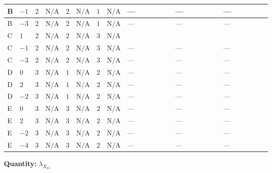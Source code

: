 \documentclass[8pt]{article}
\begin{document}
\begin{landscape}
\begin{longtable}{@{}llcccccc >{\raggedright\arraybackslash}p{0.21\linewidth} >{\raggedright\arraybackslash}p{0.21\linewidth} >{\raggedright\arraybackslash}p{0.21\linewidth}@{}}
\midrule
B & $-1$ & $2$ & $\text{N/A}$ & $2$ & $\text{N/A}$ & $1$ & $\text{N/A}$ & --- & --- & --- \\
\midrule
B & $-3$ & $2$ & $\text{N/A}$ & $2$ & $\text{N/A}$ & $1$ & $\text{N/A}$ & --- & --- & --- \\
\midrule
C & $1$ & $2$ & $\text{N/A}$ & $2$ & $\text{N/A}$ & $3$ & $\text{N/A}$ & \scriptsize\adjustbox{max width=\linewidth}{$\begin{gathered} +2 {\lambda_1} {\lambda_{X_{15}}}\end{gathered}$} & \scriptsize\adjustbox{max width=\linewidth}{$\begin{gathered} +8 {\lambda_{HS_1}^{(1)}} {\lambda_{X_{15}}}\end{gathered}$} & \scriptsize\adjustbox{max width=\linewidth}{$\begin{gathered} +4 {\lambda_{HS_1}^{(A)}} {\lambda_{X_{15}}}\end{gathered}$} \\
\midrule
C & $-1$ & $2$ & $\text{N/A}$ & $2$ & $\text{N/A}$ & $3$ & $\text{N/A}$ & --- & --- & --- \\
\midrule
C & $-3$ & $2$ & $\text{N/A}$ & $2$ & $\text{N/A}$ & $3$ & $\text{N/A}$ & --- & --- & --- \\
\midrule
D & $0$ & $3$ & $\text{N/A}$ & $1$ & $\text{N/A}$ & $2$ & $\text{N/A}$ & --- & --- & --- \\
\midrule
D & $2$ & $3$ & $\text{N/A}$ & $1$ & $\text{N/A}$ & $2$ & $\text{N/A}$ & --- & --- & --- \\
\midrule
D & $-2$ & $3$ & $\text{N/A}$ & $1$ & $\text{N/A}$ & $2$ & $\text{N/A}$ & --- & --- & --- \\
\midrule
E & $0$ & $3$ & $\text{N/A}$ & $3$ & $\text{N/A}$ & $2$ & $\text{N/A}$ & --- & --- & --- \\
\midrule
E & $2$ & $3$ & $\text{N/A}$ & $3$ & $\text{N/A}$ & $2$ & $\text{N/A}$ & --- & --- & --- \\
\midrule
E & $-2$ & $3$ & $\text{N/A}$ & $3$ & $\text{N/A}$ & $2$ & $\text{N/A}$ & --- & --- & --- \\
\midrule
E & $-4$ & $3$ & $\text{N/A}$ & $3$ & $\text{N/A}$ & $2$ & $\text{N/A}$ & --- & --- & --- \\
\midrule
\bottomrule
\end{longtable}
\clearpage
\noindent\textbf{Quantity: }${\lambda_{X_{15}}}$\par\smallskip

\end{landscape}
\end{document}
